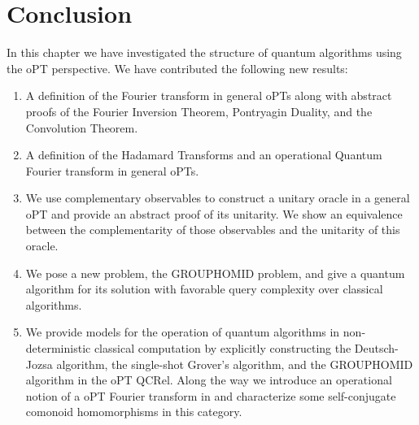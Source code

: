\section{Conclusion}
In this chapter we have investigated the structure of quantum algorithms using the oPT perspective. We have contributed the following new results:
\begin{enumerate}
\item A definition of the Fourier transform in general oPTs along with abstract proofs of the Fourier Inversion Theorem, Pontryagin Duality, and the Convolution Theorem.
\item A definition of the Hadamard Transforms and an operational Quantum Fourier transform in general oPTs.
\item We use complementary observables to construct a unitary oracle in a general oPT and provide an abstract proof of its unitarity.  We show an equivalence between the complementarity of those observables and the unitarity of this oracle.
\item We pose a new problem, the GROUPHOMID problem, and give a quantum algorithm for its solution with favorable query complexity over classical algorithms.
\item We provide models for the operation of quantum algorithms in non-deterministic classical computation by explicitly constructing the Deutsch-Jozsa algorithm, the single-shot Grover's algorithm, and the GROUPHOMID algorithm in the oPT QCRel. Along the way we introduce an operational notion of a oPT Fourier transform in  and characterize some self-conjugate comonoid homomorphisms in this category.
\end{enumerate}


